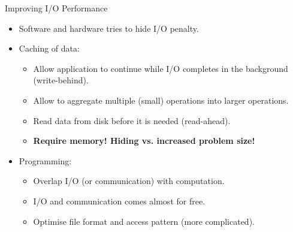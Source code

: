 \documentclass[compress,11pt,xcolor=svgnames,aspectratio=169]{beamer}
\begin{document}
\begin{frame}[fragile]{Improving I/O Performance}

\begin{itemize}
\setlength\itemsep{0.3cm}

\item Software and hardware tries to hide I/O penalty.

\item Caching of data:

  \begin{itemize}
  \setlength\itemsep{0.2cm}
    \item Allow application to continue while I/O completes in the background (write-behind).
    \item Allow to aggregate multiple (small) operations into larger operations.
    \item Read data from disk before it is needed (read-ahead).
    \item \textbf{Require memory! Hiding vs. increased problem size!}
  \end{itemize}

\item Programming:

  \begin{itemize}
  \setlength\itemsep{0.2cm}
    \item Overlap I/O (or communication) with computation.
    \item I/O and communication comes almost for free.
    \item Optimise file format and access pattern (more complicated).
  \end{itemize}

\end{itemize}

\end{frame}
\end{document}
